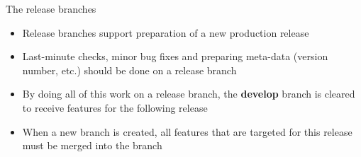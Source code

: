 \begin{frame}[fragile,c]{The release branches}
\begin{onlyenv}
\begin{minipage}[c]{0.95\textwidth}
            \setlength{\leftmargini}{1mm}
            \begin{itemize}
                \setlength{\itemsep}{3mm}
                \item Release branches support preparation of a new production release
                \item Last-minute checks, minor bug fixes and preparing meta-data (version number,
                etc.) should be done on a release branch
                \item By doing all of this work on a release branch, the \textbf{develop}
                branch is cleared to receive features for the following release
                \item \alert{When a new  branch is created, all features that are
                    targeted for this release must be merged into the  branch}
            \end{itemize}
        \end{minipage}
    \end{onlyenv}
\end{frame}
